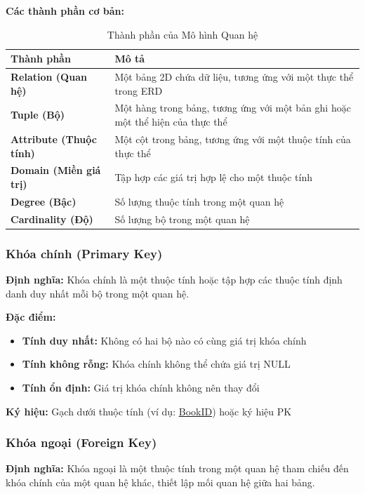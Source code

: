 \documentclass[12pt,a4paper]{article}
\begin{document}
\textbf{Các thành phần cơ bản:}

\begin{table}[H]
\centering
\caption{Thành phần của Mô hình Quan hệ}
\begin{tabular}{@{}|l|p{9cm}|@{}}
\hline
\textbf{Thành phần} & \textbf{Mô tả} \\ \hline
\textbf{Relation (Quan hệ)} & Một bảng 2D chứa dữ liệu, tương ứng với một thực thể trong ERD \\ \hline
\textbf{Tuple (Bộ)} & Một hàng trong bảng, tương ứng với một bản ghi hoặc một thể hiện của thực thể \\ \hline
\textbf{Attribute (Thuộc tính)} & Một cột trong bảng, tương ứng với một thuộc tính của thực thể \\ \hline
\textbf{Domain (Miền giá trị)} & Tập hợp các giá trị hợp lệ cho một thuộc tính \\ \hline
\textbf{Degree (Bậc)} & Số lượng thuộc tính trong một quan hệ \\ \hline
\textbf{Cardinality (Độ)} & Số lượng bộ trong một quan hệ \\ \hline
\end{tabular}
\end{table}

\subsubsection{Khóa chính (Primary Key)}

\textbf{Định nghĩa:} Khóa chính là một thuộc tính hoặc tập hợp các thuộc tính định danh duy nhất mỗi bộ trong một quan hệ.

\textbf{Đặc điểm:}
\begin{itemize}
    \item \textbf{Tính duy nhất:} Không có hai bộ nào có cùng giá trị khóa chính
    \item \textbf{Tính không rỗng:} Khóa chính không thể chứa giá trị NULL
    \item \textbf{Tính ổn định:} Giá trị khóa chính không nên thay đổi
\end{itemize}

\textbf{Ký hiệu:} Gạch dưới thuộc tính (ví dụ: \underline{BookID}) hoặc ký hiệu PK

\subsubsection{Khóa ngoại (Foreign Key)}

\textbf{Định nghĩa:} Khóa ngoại là một thuộc tính trong một quan hệ tham chiếu đến khóa chính của một quan hệ khác, thiết lập mối quan hệ giữa hai bảng.
\end{document}
